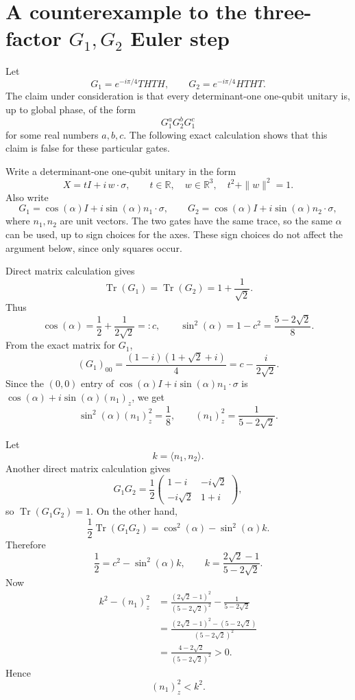 \documentclass[11pt]{article}
\newcommand{\Tr}{\operatorname{Tr}}
\newcommand{\ii}{i}
\newcommand{\Gone}{G_1}
\newcommand{\Gtwo}{G_2}
\newcommand{\pauli}{\sigma}
\begin{document}
\section*{A counterexample to the three-factor $G_1,G_2$ Euler step}

Let
\[
  \Gone = e^{-\ii\pi/4}THTH,
  \qquad
  \Gtwo = e^{-\ii\pi/4}HTHT.
\]
The claim under consideration is that every determinant-one one-qubit unitary
is, up to global phase, of the form
\[
  \Gone^a\Gtwo^b\Gone^c
\]
for some real numbers $a,b,c$.  The following exact calculation shows that this
claim is false for these particular gates.

Write a determinant-one one-qubit unitary in the form
\[
  X=tI+\ii\,w\cdot\pauli,
  \qquad
  t\in\mathbb{R},\quad w\in\mathbb{R}^3,\quad t^2+\|w\|^2=1.
\]
Also write
\[
  \Gone=\cos(\alpha)I+\ii\sin(\alpha)n_1\cdot\pauli,
  \qquad
  \Gtwo=\cos(\alpha)I+\ii\sin(\alpha)n_2\cdot\pauli,
\]
where $n_1,n_2$ are unit vectors.  The two gates have the same trace, so the
same $\alpha$ can be used, up to sign choices for the axes.  These sign choices
do not affect the argument below, since only squares occur.

Direct matrix calculation gives
\[
  \Tr(\Gone)=\Tr(\Gtwo)=1+\frac{1}{\sqrt2}.
\]
Thus
\[
  \cos(\alpha)
  =
  \frac12+\frac{1}{2\sqrt2}
  =:c,
  \qquad
  \sin^2(\alpha)=1-c^2=\frac{5-2\sqrt2}{8}.
\]
From the exact matrix for $\Gone$,
\[
  (\Gone)_{00}
  =
  \frac{(1-\ii)(1+\sqrt2+\ii)}{4}
  =
  c-\frac{\ii}{2\sqrt2}.
\]
Since the $(0,0)$ entry of
$\cos(\alpha)I+\ii\sin(\alpha)n_1\cdot\pauli$ is
$\cos(\alpha)+\ii\sin(\alpha)(n_1)_z$, we get
\[
  \sin^2(\alpha)(n_1)_z^2=\frac18,
  \qquad
  (n_1)_z^2=\frac{1}{5-2\sqrt2}.
\]

Let
\[
  k=\langle n_1,n_2\rangle .
\]
Another direct matrix calculation gives
\[
  \Gone\Gtwo
  =
  \frac12
  \begin{pmatrix}
    1-\ii & -\ii\sqrt2 \\
    -\ii\sqrt2 & 1+\ii
  \end{pmatrix},
\]
so $\Tr(\Gone\Gtwo)=1$.  On the other hand,
\[
  \frac12\Tr(\Gone\Gtwo)
  =
  \cos^2(\alpha)-\sin^2(\alpha)k.
\]
Therefore
\[
  \frac12=c^2-\sin^2(\alpha)k,
  \qquad
  k=\frac{2\sqrt2-1}{5-2\sqrt2}.
\]
Now
\[
\begin{aligned}
  k^2-(n_1)_z^2
  &=
  \frac{(2\sqrt2-1)^2}{(5-2\sqrt2)^2}
  -
  \frac{1}{5-2\sqrt2}                                      \\
  &=
  \frac{(2\sqrt2-1)^2-(5-2\sqrt2)}{(5-2\sqrt2)^2}             \\
  &=
  \frac{4-2\sqrt2}{(5-2\sqrt2)^2}
  >0.
\end{aligned}
\]
Hence
\[
  (n_1)_z^2<k^2.
\]
\end{document}
